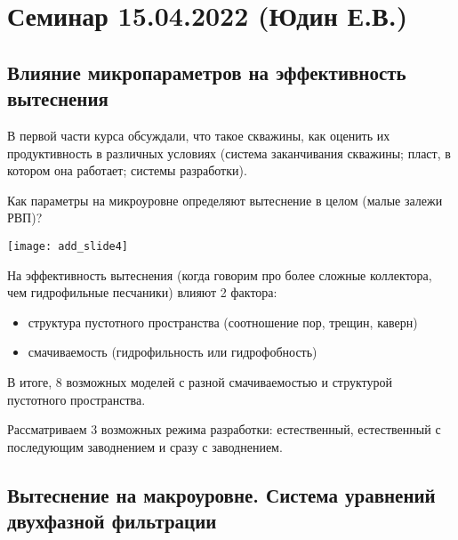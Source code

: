 \documentclass[main.tex]{subfiles}
\begin{document}
\section{Семинар 15.04.2022 (Юдин Е.В.)}

\subsection{Влияние микропараметров на эффективность вытеснения}

В первой части курса обсуждали, что такое скважины, как оценить их продуктивность в различных условиях (система заканчивания скважины; пласт, в котором она работает; системы разработки).

Как параметры на микроуровне определяют вытеснение в целом (малые залежи РВП)?

\texttt{[image: add\_slide4]}








На эффективность вытеснения (когда говорим про более сложные коллектора, чем гидрофильные песчаники) влияют 2 фактора:
\begin{itemize}
	\item структура пустотного пространства (соотношение пор, трещин, каверн)
	\item смачиваемость (гидрофильность или гидрофобность)
\end{itemize}
В итоге, 8 возможных моделей с разной смачиваемостью и структурой пустотного пространства.


Рассматриваем 3 возможных режима разработки: естественный, естественный с последующим заводнением и сразу с заводнением.


\subsection{Вытеснение на макроуровне. Система уравнений двухфазной фильтрации}
\end{document}

